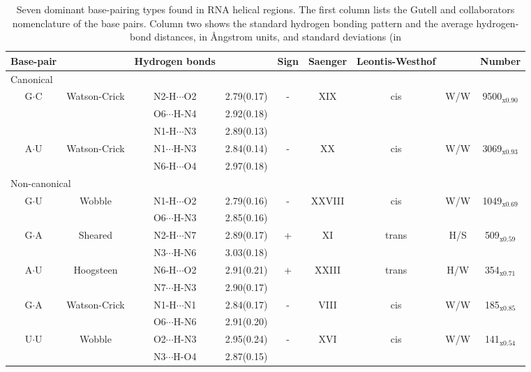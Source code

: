\begin{table}
\begin{center}
\begin{tabular}{|c c|c c|c|c|c c|c|}
\hline
Base-pair & & Hydrogen bonds &  & Sign & Saenger & Leontis-Westhof & &
Number \\
\hline
\hline
\multicolumn{9}{|l|}{Canonical} \\
\hline
G$\cdot$C & Watson-Crick & N2-H$\cdots$O2 & 2.79(0.17) & - & XIX & cis
 & W/W & 9500$_{\text{x0.90}}$ \\
 & & O6$\cdots$H-N4 & 2.92(0.18) & & & & &  \\
 & & N1-H$\cdots$N3 & 2.89(0.13) & & & & &  \\
\hline
A$\cdot$U & Watson-Crick & N1$\cdots$H-N3 & 2.84(0.14) & - & XX & cis
& W/W & 3069$_{\text{x0.93}}$ \\
 & & N6-H$\cdots$O4 & 2.97(0.18) & & & & &  \\
\hline
\multicolumn{9}{|l|}{Non-canonical} \\
\hline
G$\cdot$U & Wobble & N1-H$\cdots$O2 & 2.79(0.16) & - & XXVIII & cis
 & W/W & 1049$_{\text{x0.69}}$ \\
 & & O6$\cdots$H-N3 & 2.85(0.16) & & & & &  \\
\hline
G$\cdot$A & Sheared & N2-H$\cdots$N7 & 2.89(0.17) & + & XI & trans
 & H/S & 509$_{\text{x0.59}}$ \\
 & & N3$\cdots$H-N6 & 3.03(0.18) & & & & &  \\
\hline
A$\cdot$U & Hoogsteen & N6-H$\cdots$O2 & 2.91(0.21) & + & XXIII & trans
 & H/W & 354$_{\text{x0.71}}$ \\
 & & N7$\cdots$H-N3 & 2.90(0.17) & & & & &  \\
\hline
G$\cdot$A & Watson-Crick & N1-H$\cdots$N1 & 2.84(0.17) & - & VIII & cis
 & W/W & 185$_{\text{x0.85}}$ \\
 & & O6$\cdots$H-N6 & 2.91(0.20) & & & & &  \\
\hline
U$\cdot$U & Wobble & O2$\cdots$H-N3 & 2.95(0.24) & - & XVI & cis
 & W/W & 141$_{\text{x0.54}}$ \\
 & & N3$\cdots$H-O4 & 2.87(0.15) & & & & &  \\
\hline
\end{tabular}
\caption{Seven  dominant  base-pairing  types  found  in  RNA  helical
regions.   The  first  column   lists  the  Gutell  and  collaborators
nomenclature \cite{lee2004}  of the base  pairs. Column two  shows the
standard  hydrogen  bonding  pattern  and  the  average  hydrogen-bond
distances, in \AA ngstrom units, and standard deviations (in
}
\end{center}
\end{table}
